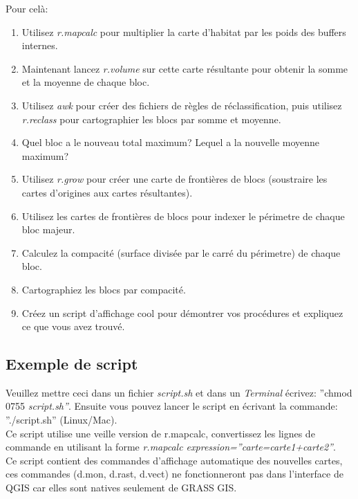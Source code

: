 \noindent Pour cel\`a:

\begin{enumerate}
\item Utilisez \textit{r.mapcalc} pour multiplier la carte d'habitat par les poids des buffers internes.
\item Maintenant lancez \textit{r.volume }sur cette carte r\'esultante pour obtenir la somme et la moyenne de chaque bloc.
\item Utilisez  \textit{awk} pour cr\'eer des fichiers de r\`egles de r\'eclassification, puis utilisez \textit{r.reclass} pour cartographier les blocs par somme et moyenne.
\item Quel bloc a le nouveau total maximum? Lequel a la nouvelle moyenne maximum?
\item Utilisez \textit{r.grow} pour cr\'eer une carte de fronti\`eres de blocs (soustraire les cartes d'origines aux cartes r\'esultantes).
\item Utilisez les cartes de fronti\`eres de blocs pour indexer le p\'erimetre de chaque bloc majeur. 
\item Calculez la compacit\'e (surface divis\'ee par le carr\'e du p\'erimetre) de chaque bloc. 
\item Cartographiez les blocs par compacit\'e. 
\item Cr\'eez un script d'affichage cool pour d\'emontrer vos proc\'edures et expliquez ce que vous avez trouv\'e.
\end{enumerate}

\subsection{Exemple de script}

\noindent Veuillez mettre ceci dans un fichier \textit{script.sh} \textup{et dans un } \textit{Terminal} \textup{ \'ecrivez: ''chmod 0755} \textit{script.sh''}\textup{. Ensuite vous pouvez lancer le script } en \'ecrivant la commande: ''./script.sh'' (Linux/Mac). \\
\noindent Ce script utilise une veille version de r.mapcalc, convertissez les lignes de commande en utilisant la forme \textit{r.mapcalc expression=''carte=carte1+carte2''}. \\
\noindent Ce script contient des commandes d'affichage automatique des nouvelles cartes, ces commandes (d.mon, d.rast, d.vect) ne fonctionneront pas dans l'interface de QGIS car elles sont natives seulement de GRASS GIS. 


